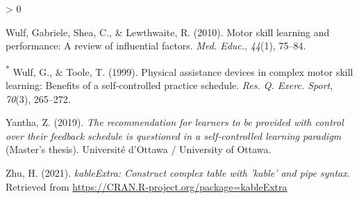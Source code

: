 \documentclass[
  english,
  man,floatsintext]{apa7}
\newlength{\cslhangindent}
\newenvironment{CSLReferences}[2] %
 {%
  \setlength{\parindent}{0pt}
  \ifodd #1 \everypar{\setlength{\hangindent}{\cslhangindent}}\ignorespaces\fi
  \ifnum #2 > 0
  \setlength{\parskip}{#2\baselineskip}
  \fi
 }%
 {}
\begin{document}
\begin{CSLReferences}{1}{0}
\leavevmode\hypertarget{ref-Wulf2010-uw}{}%
Wulf, Gabriele, Shea, C., \& Lewthwaite, R. (2010). Motor skill learning and performance: A review of influential factors. \emph{Med. Educ.}, \emph{44}(1), 75--84.

\leavevmode\hypertarget{ref-Wulf1999-pn}{}%
\textsuperscript{*} Wulf, G., \& Toole, T. (1999). Physical assistance devices in complex motor skill learning: Benefits of a self-controlled practice schedule. \emph{Res. Q. Exerc. Sport}, \emph{70}(3), 265--272.

\leavevmode\hypertarget{ref-Yantha2019-dt}{}%
Yantha, Z. (2019). \emph{The recommendation for learners to be provided with control over their feedback schedule is questioned in a self-controlled learning paradigm} (Master's thesis). Universit{é} d'Ottawa / University of Ottawa.

\leavevmode\hypertarget{ref-R-kableExtra}{}%
Zhu, H. (2021). \emph{kableExtra: Construct complex table with 'kable' and pipe syntax}. Retrieved from \url{https://CRAN.R-project.org/package=kableExtra}

\end{CSLReferences}


\clearpage
\makeatletter
\efloat@restorefloats
\makeatother
\end{document}
